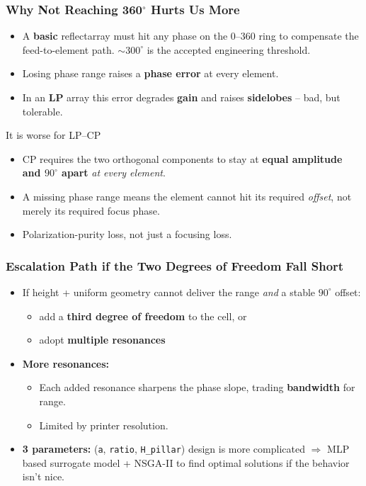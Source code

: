\documentclass[aspectratio=43]{beamer}
\begin{document}
\begin{frame}[fragile]
  \frametitle{Why Not Reaching 360$^\circ$ Hurts Us More}
  \begin{itemize}
    \item A \textbf{basic} reflectarray must hit any phase on the $0$--$360$ ring
      to compensate the feed-to-element path. $\sim 300^\circ$ is the accepted
      engineering threshold.
    \item Losing phase range raises a \textbf{phase error} at every element.
    \item In an \textbf{LP} array this error degrades \textbf{gain} and raises
      \textbf{sidelobes} -- bad, but tolerable.
  \end{itemize}
  \begin{alertblock}{It is worse for LP--CP}
    \begin{itemize}
      \item CP requires the two orthogonal components to stay at
        \textbf{equal amplitude and $90^\circ$ apart} \emph{at every element}.
      \item A missing phase range means the element cannot hit its required
        \emph{offset}, not merely its required focus phase.
      \item Polarization-purity loss, not just a focusing loss.
    \end{itemize}
  \end{alertblock}
\end{frame}



\begin{frame}[fragile]
  \frametitle{Escalation Path if the Two Degrees of Freedom Fall Short}
  \begin{itemize}
    \item If height + uniform geometry cannot deliver the range \emph{and}
      a stable $90^\circ$ offset:
      \begin{itemize}
        \item add a \textbf{third degree of freedom} to the cell, or
        \item adopt \textbf{multiple resonances}
      \end{itemize}
    \item \textbf{More resonances:}
      \begin{itemize}
        \item Each added resonance sharpens the phase slope, trading \textbf{bandwidth} for range.
        \item Limited by printer resolution.
      \end{itemize}
    \item \textbf{3 parameters:} (\verb|a|, \verb|ratio|, \verb|H_pillar|) design is more complicated $\Rightarrow$ MLP based surrogate model + NSGA-II to find optimal solutions if the behavior isn't nice.
  \end{itemize}
\end{frame}

\end{document}
